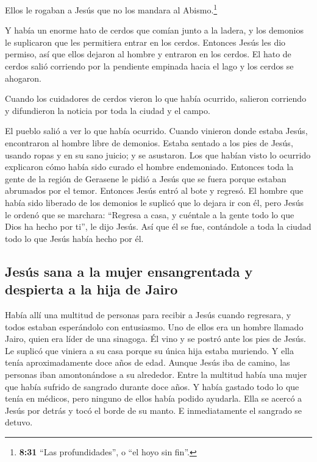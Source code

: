  Ellos le rogaban a Jesús que no los mandara al
Abismo.\footnote{\textbf{8:31} ``Las profundidades'', o ``el hoyo sin
  fin''.}

 Y había un enorme hato de cerdos que comían junto a la
ladera, y los demonios le suplicaron que les permitiera entrar en los
cerdos. Entonces Jesús les dio permiso,  así que ellos
dejaron al hombre y entraron en los cerdos. El hato de cerdos salió
corriendo por la pendiente empinada hacia el lago y los cerdos se
ahogaron.

 Cuando los cuidadores de cerdos vieron lo que había
ocurrido, salieron corriendo y difundieron la noticia por toda la ciudad
y el campo.

 El pueblo salió a ver lo que había ocurrido. Cuando
vinieron donde estaba Jesús, encontraron al hombre libre de demonios.
Estaba sentado a los pies de Jesús, usando ropas y en su sano juicio; y
se asustaron.  Los que habían visto lo ocurrido
explicaron cómo había sido curado el hombre endemoniado. 
Entonces toda la gente de la región de Gerasene le pidió a Jesús que se
fuera porque estaban abrumados por el temor. Entonces Jesús entró al
bote y regresó.  El hombre que había sido liberado de los
demonios le suplicó que lo dejara ir con él, pero Jesús le ordenó que se
marchara:  ``Regresa a casa, y cuéntale a la gente todo
lo que Dios ha hecho por ti'', le dijo Jesús. Así que él se fue,
contándole a toda la ciudad todo lo que Jesús había hecho por él.

\hypertarget{jesuxfas-sana-a-la-mujer-ensangrentada-y-despierta-a-la-hija-de-jairo}{%
\subsection{Jesús sana a la mujer ensangrentada y despierta a la hija de
Jairo}\label{jesuxfas-sana-a-la-mujer-ensangrentada-y-despierta-a-la-hija-de-jairo}}

 Había allí una multitud de personas para recibir a Jesús
cuando regresara, y todos estaban esperándolo con entusiasmo.
 Uno de ellos era un hombre llamado Jairo, quien era
líder de una sinagoga. Él vino y se postró ante los pies de Jesús. Le
suplicó que viniera a su casa  porque su única hija
estaba muriendo. Y ella tenía aproximadamente doce años de edad. Aunque
Jesús iba de camino, las personas iban amontonándose a su alrededor.
 Entre la multitud había una mujer que había sufrido de
sangrado durante doce años. Y había gastado todo lo que tenía en
médicos, pero ninguno de ellos había podido ayudarla. 
Ella se acercó a Jesús por detrás y tocó el borde de su manto. E
inmediatamente el sangrado se detuvo.

